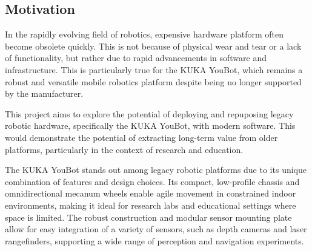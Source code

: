 \documentclass[a4paper, 12pt]{article}
\newif\ifshowadi
\newcommand{\adi}[1]{\ifshowadi\textcolor{red}{#1}\fi}
\newif\ifshownotes
\newcommand{\notes}[1]{\ifshownotes\textcolor{blue}{#1}\fi}
\begin{document}
     \subsection{Motivation}
    \adi{Motivation: Why is this project worthwhile? What did I stand to gain from this? This part is forward-looking and conceptual; it establishes the intent and value proposition for the project.}
    \notes{1.1 Motivation Why this project? Explore the potential of repurposing legacy robotic platforms like the KUKA YouBot. Address the need for longer lifespans in academic robotics hardware. Personal/academic gain: Engage with low-level robotics systems. Learn system integration, perception, and hardware/software interfacing.}

    In the rapidly evolving field of robotics, expensive hardware platform often become obsolete quickly. This is not because of physical wear and tear or a lack of functionality, but rather due to rapid advancements in software and infrastructure. This is particularly true for the KUKA YouBot, which remains a robust and versatile mobile robotics platform despite being no longer supported by the manufacturer. 

    This project aims to explore the potential of deploying and repuposing legacy robotic hardware, specifically the KUKA YouBot, with modern software. This would demonstrate the potential of extracting long-term value from older platforms, particularly in the context of research and education.

    \adi{Potential: Highlights unique physical and design attributes of the robot that make it worth saving. Why is it distinct? Robot's inherent capabilities and versatility. Mini technical pitch.}
    \notes{1.3 Use Case Potential: Unique attributes of the YouBot: Compact, low-profile, omnidirectional drive. Reliable base hardware and extensibility. Application areas: Autonomous indoor navigation. HRI (Human-Robot Interaction) research. Visual/LIDAR-based perception projects. Education and prototyping platforms.}

    The KUKA YouBot stands out among legacy robotic platforms due to its unique combination of features and design choices. Its compact, low-profile chassis and omnidirectional mecanum wheels enable agile movement in constrained indoor environments, making it ideal for research labs and educational settings where space is limited. The robust construction and modular sensor mounting plate allow for easy integration of a variety of sensors, such as depth cameras and laser rangefinders, supporting a wide range of perception and navigation experiments.
\end{document}
